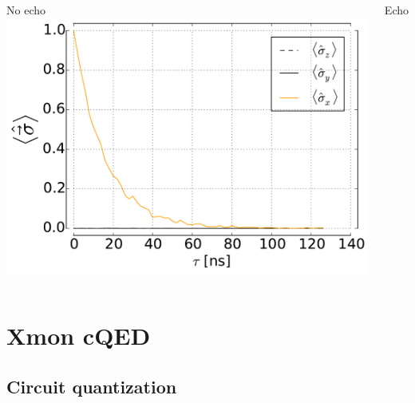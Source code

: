 \documentclass[aspectratio=169, 13pt]{beamer}
\begin{document}
\begin{frame}[c]
{\begin{columns}[c]
	No echo
	\centering
	\includegraphics[width=\textwidth]{deph_white_se}
	
	Echo
	\end{columns}
}
\end{frame}

\section{Xmon cQED}


\subsection{Circuit quantization}
\end{document}
